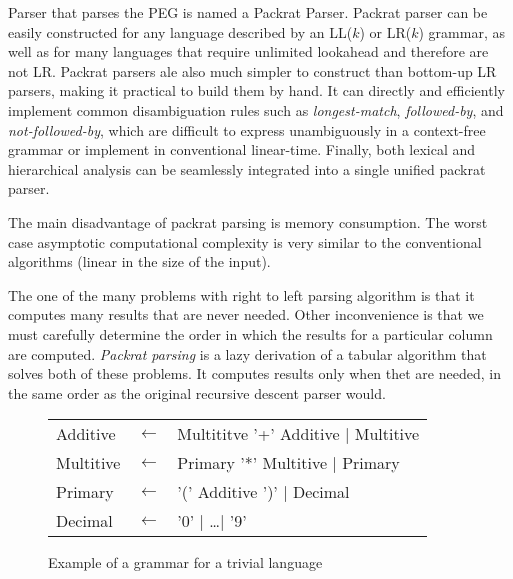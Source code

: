 Parser that parses the PEG is named a Packrat Parser.
Packrat parser can be easily constructed for any language described by an LL($k$) or LR($k$) grammar, as well as for many languages that require unlimited lookahead and therefore are not LR.
Packrat parsers ale also much simpler to construct than bottom-up LR parsers, making it practical to build them by hand.
It can directly and efficiently implement common disambiguation rules such as \textit{longest-match}, \textit{followed-by}, and \textit{not-followed-by}, which are difficult to express unambiguously in a context-free grammar or implement in conventional linear-time.
Finally, both lexical and hierarchical analysis can be seamlessly integrated into a single unified packrat parser.

The main disadvantage of packrat parsing is memory consumption.
The worst case asymptotic computational complexity is very similar to the conventional algorithms (linear in the size of the input).

The one of the many problems with right to left parsing algorithm is that it computes many results that are never needed.
Other inconvenience is that we must carefully determine the order in which the results for a particular column are computed.
\textit{Packrat parsing} is a lazy derivation of a tabular algorithm that solves both of these problems. It computes results only when thet are needed, in the same order as the original recursive descent parser would.
\cite{Ford:PEG}

\begin{figure}
	\begin{center}
  \begin{tabular}{lcl}
      Additive  & $\leftarrow$ & Multititve '+' Additive | Multitive \\
      Multitive & $\leftarrow$ & Primary '*' Multitive | Primary     \\
      Primary   & $\leftarrow$ & '(' Additive ')' | Decimal          \\
      Decimal   & $\leftarrow$ & '0' | \ldots | '9'
  \end{tabular}
  \end{center}
  \caption{Example of a grammar for a trivial language}
  \label{fig:pegtl:example}
 \end{figure}

